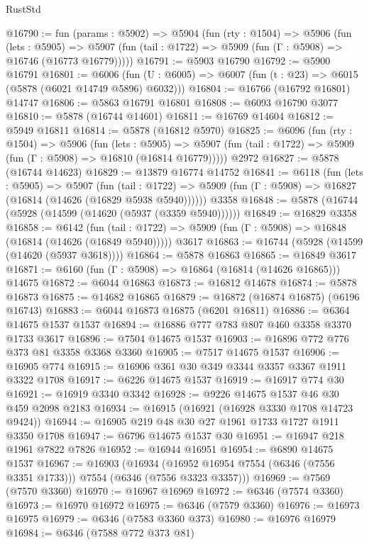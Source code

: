 \begin{lexlean}{RustStd}
\begin{coremodule}
@16790 := fun (params : @5902) =>
  @5904
    (fun (rty : @1504) =>
    @5906
      (fun (lets : @5905) =>
      @5907 (fun (tail : @1722) => @5909 (fun (Γ : @5908) => @16746 (@16773 @16779)))))
@16791 := @5903 @16790
@16792 := @5900 @16791
@16801 := @6006
    (fun (U : @6005) => @6007 (fun (t : @23) => @6015 (@5878 (@6021 @14749 @5896) @6032)))
@16804 := @16766 (@16792 @16801) @14747
@16806 := @5863 @16791 @16801
@16808 := @6093 @16790 @3077
@16810 := @5878 (@16744 @14601)
@16811 := @16769 @14604
@16812 := @5949 @16811
@16814 := @5878 (@16812 @5970)
@16825 := @6096
    (fun (rty : @1504) =>
    @5906
      (fun (lets : @5905) =>
      @5907 (fun (tail : @1722) => @5909 (fun (Γ : @5908) => @16810 (@16814 @16779)))))
    @2972
@16827 := @5878 (@16744 @14623)
@16829 := @13879 @16774 @14752
@16841 := @6118
    (fun (lets : @5905) =>
    @5907
      (fun (tail : @1722) =>
      @5909 (fun (Γ : @5908) => @16827 (@16814 (@14626 (@16829 @5938 @5940))))))
    @3358
@16848 := @5878 (@16744 (@5928 (@14599 (@14620 (@5937 (@3359 @5940))))))
@16849 := @16829 @3358
@16858 := @6142
    (fun (tail : @1722) => @5909 (fun (Γ : @5908) => @16848 (@16814 (@14626 (@16849 @5940)))))
    @3617
@16863 := @16744 (@5928 (@14599 (@14620 (@5937 @3618))))
@16864 := @5878 @16863
@16865 := @16849 @3617
@16871 := @6160 (fun (Γ : @5908) => @16864 (@16814 (@14626 @16865))) @14675
@16872 := @6044 @16863
@16873 := @16812 @14678
@16874 := @5878 @16873
@16875 := @14682 @16865
@16879 := @16872 (@16874 @16875) (@6196 @16743)
@16883 := @6044 @16873 @16875 (@6201 @16811)
@16886 := @6364 @14675 @1537 @1537
@16894 := @16886 @777 @783 @807 @460 @3358 @3370 @1733 @3617
@16896 := @7504 @14675 @1537
@16903 := @16896 @772 @776 @373 @81 @3358 @3368 @3360
@16905 := @7517 @14675 @1537
@16906 := @16905 @774
@16915 := @16906 @361 @30 @349 @3344 @3357 @3367 @1911 @3322 @1708
@16917 := @6226 @14675 @1537
@16919 := @16917 @774 @30
@16921 := @16919 @3340 @3342
@16928 := @9226 @14675 @1537 @46 @30 @459 @2098 @2183
@16934 := @16915 (@16921 (@16928 @3330 @1708 @14723 @9424))
@16944 := @16905 @219 @48 @30 @27 @1961 @1733 @1727 @1911 @3350 @1708
@16947 := @6796 @14675 @1537 @30
@16951 := @16947 @218 @1961 @7822 @7826
@16952 := @16944 @16951
@16954 := @6890 @14675 @1537
@16967 := @16903
    (@16934 (@16952 @16954 @7554 (@6346 (@7556 @3351 @1733))) @7554 (@6346 (@7556 @3323 @3357)))
@16969 := @7569 (@7570 @3360)
@16970 := @16967 @16969
@16972 := @6346 (@7574 @3360)
@16973 := @16970 @16972
@16975 := @6346 (@7579 @3360)
@16976 := @16973 @16975
@16979 := @6346 (@7583 @3360 @373)
@16980 := @16976 @16979
@16984 := @6346 (@7588 @772 @373 @81)

\end{coremodule}
\end{lexlean}

